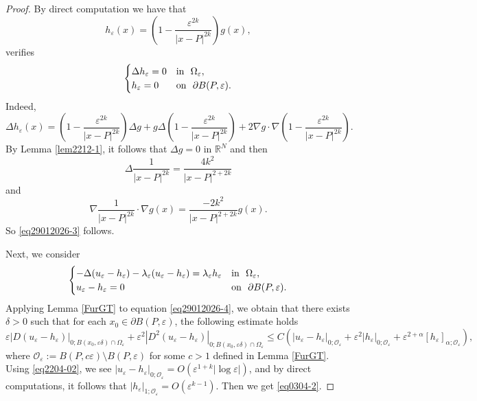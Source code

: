 \documentclass[11pt,reqno]{article}
\numberwithin{equation}{section}
\newcommand\R{\mathbb R}
\newcommand\e\varepsilon
\renewcommand\O\Omega
\begin{document}
    \begin{proof}
    By direct computation we have that 
    \begin{equation}
      h_\e(x)=  \left(1-\frac{\e^{2k}}{|x-P|^{2k}}\right)g(x),
    \end{equation}
    verifies 
    \begin{equation}\label{eq29012026-3}
    \begin{cases}
         \Delta h_\e=0 &\hbox{in }\ \O_\e,\\
         h_\e=0&\hbox{on }\  \partial B(P,\e).\\
         
    \end{cases}
    \end{equation}
    Indeed,
    \begin{equation}
         \Delta h_\e(x)=\left(1-\frac{\e^{2k}}{|x-P|^{2k}}\right)\Delta g+g\Delta \left(1-\frac{\e^{2k}}{|x-P|^{2k}}\right)+2\nabla g\cdot \nabla \left(1-\frac{\e^{2k}}{|x-P|^{2k}}\right).
    \end{equation}
    By Lemma \ref{lem2212-1}, it follows that
    $\Delta g=0$ in $\R^N$  and then
    \begin{equation}
         \Delta \frac{1}{|x-P|^{2k}}=\frac{4k^2}{|x-P|^{2+2k}}
    \end{equation}
    and
    \begin{equation}
        \nabla  \frac{1}{|x-P|^{2k}}\cdot\nabla g(x)=\frac{-2k^2}{|x-P|^{2+2k}}g(x).
    \end{equation}
 So \eqref{eq29012026-3} follows.
    
    Next, we consider 
    \begin{equation}\label{eq29012026-4}
        \begin{cases}
               -\Delta (u_\e-h_\e)-\lambda_\e (u_\e-h_\e)=\lambda_\e h_\e &\hbox{in }\ \O_\e,\\
        u_\e- h_\e=0&\hbox{on }\  \partial B(P,\e).\\
        \end{cases}
    \end{equation}
    Applying  Lemma \ref{FurGT} to equation \eqref{eq29012026-4}, we obtain that there exists $\delta>0$ such that for each $x_0\in \partial B(P,\e)$, the following estimate holds
    \begin{equation}
        \e|D(u_\e-h_\e)|_{0;B(x_0,\e\delta)\cap \O_\e }+\e^2|D^2(u_\e-h_\e)|_{0;B(x_0,\e\delta)\cap \O_\e }\leq C\left(|u_\e-h_\e|_{0;\mathcal{O}_\e}+\e^2|h_\e|_{0;\mathcal{O}_\e}+\e^{2+\alpha}[h_\e]_{\alpha;\mathcal{O}_\e}\right),
    \end{equation}
    where $\mathcal{O}_\e:=B(P,c\e)\setminus B(P,\e)$ for some $c>1$  defined in Lemma \ref{FurGT}. Using \eqref{eq2204-02},  we see $|u_\e-h_\e|_{0;\mathcal{O}_\e}=O(\e^{1+k}|\log\e|)$,  and by direct computations, it follows that $|h_\e|_{1;\mathcal{O}_\e}=O(\e^{k-1})$.
    Then we  get \eqref{eq0304-2}.  


\end{proof}
\end{document}
